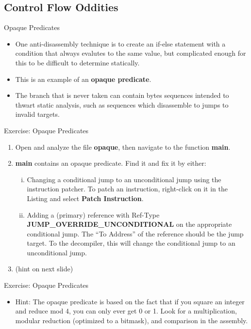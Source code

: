 \documentclass{beamer}
\begin{document}
\subsection{Control Flow Oddities}
\begin{frame}
\begin{block}{Opaque Predicates}
\begin{itemize}
\item One anti-disassembly technique is to create an if-else statement with a condition that always evalutes to the same value, but complicated enough for this to be difficult to 
determine statically.  
\item  This is an example of an \textbf{opaque predicate}.
\item  The branch that is never taken can contain bytes sequences intended to thwart static analysis, such as sequences which disassemble to jumps to invalid targets. 
\end{itemize}
\end{block}
\end{frame}

\begin{frame}
\begin{block}{Exercise: Opaque Predicates}
\begin{enumerate}
\item Open and analyze the file \textbf{opaque}, then navigate to the function \textbf{main}.
\item \textbf{main} contains an opaque predicate.  Find it and fix it by either:
\begin{enumerate}[(i)]
\item Changing a conditional jump to an unconditional jump using the instruction patcher.  To patch an instruction, right-click on it in the Listing and select \textbf{Patch Instruction}.
\item Adding a (primary) reference with Ref-Type \textbf{JUMP\_OVERRIDE\_UNCONDITIONAL} on the appropriate conditional jump. The ``To Address'' of the reference should be the jump target. 
 To the decompiler, this will change the conditional jump to an unconditional jump.
\end{enumerate}
\item[] (hint on next slide)
\end{enumerate}
\end{block}
\end{frame}

\begin{frame}
\begin{block}{Exercise: Opaque Predicates}
\begin{itemize}
\item Hint: The opaque predicate is based on the fact that if you square an integer and reduce mod 4, you can only ever get 0 or 1.  Look for a multiplication, modular reduction (optimized to a bitmask), and comparison in the assembly.
\end{itemize}
\end{block}
\end{frame}
\end{document}

